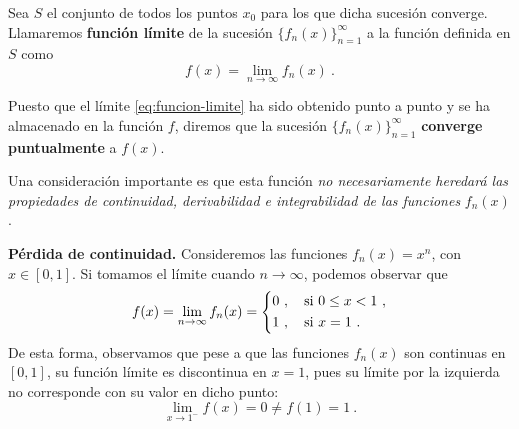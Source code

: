 Sea $S$ el conjunto de todos los puntos $x_0$ para los que dicha sucesión converge. Llamaremos \textbf{función límite} de la sucesión $\{ f_n(x) \}_{n=1}^\infty$ a la función definida en $S$ como 
\begin{equation} \label{eq:funcion-limite}
    f(x) = \lim_{n \to \infty} f_n(x) \ .
\end{equation}

\begin{defi} 
    Puesto que el límite \eqref{eq:funcion-limite} ha sido obtenido punto a punto y se ha almacenado en la función $f$, diremos que la sucesión $\{ f_n(x) \}_{n=1}^\infty$ \textbf{converge puntualmente} a $f(x)$.
\end{defi}

Una consideración importante es que esta función \emph{no necesariamente heredará las propiedades de continuidad, derivabilidad e integrabilidad de las funciones} $f_n(x)$.

\begin{ejemplo}{\textbf{Pérdida de continuidad.}}
    Consideremos las funciones $f_n(x) = x^n$, con $x \in [0,1]$. Si tomamos el límite cuando $n \to \infty$, podemos observar que
    \begin{equation*}
        f(x) = \lim_{n \to \infty} f_n(x) =
            \begin{dcases}
                0 \ , \quad \text{si } 0 \leq x < 1 \ , \\
                1 \ , \quad \text{si } x=1 \ .
            \end{dcases}
    \end{equation*}
    De esta forma, observamos que pese a que las funciones $f_n(x)$ son continuas en $[0,1]$, su función límite es discontinua en $x=1$, pues su límite por la izquierda no corresponde con su valor en dicho punto:
    \begin{equation*}
        \lim_{x\to 1^-} f(x) = 0 \neq f(1) = 1 \ .
    \end{equation*}
\end{ejemplo}

